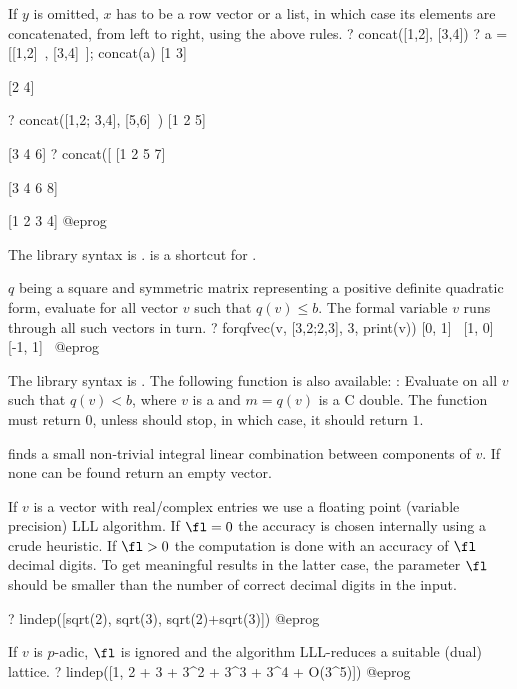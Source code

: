 If $y$ is omitted, $x$ has to be a row vector or a list, in which case its
elements are concatenated, from left to right, using the above rules.
\bprog
? concat([1,2], [3,4])
? a = [[1,2]~, [3,4]~]; concat(a)
[1 3]

[2 4]

? concat([1,2; 3,4], [5,6]~)
[1 2 5]

[3 4 6]
? concat([%
[1 2 5 7]

[3 4 6 8]

[1 2 3 4]
@eprog

The library syntax is .
 is a shortcut for .

\label{se:forqfvec}
$q$ being a square and symmetric matrix representing a positive definite
quadratic form, evaluate  for all vector $v$ such that $q(v)\leq b$.
The formal variable $v$ runs through all such vectors in turn.
\bprog
? forqfvec(v, [3,2;2,3], 3, print(v))
[0, 1]~
[1, 0]~
[-1, 1]~
@eprog

The library syntax is .
The following function is also available:
:
Evaluate  on all $v$ such that $q(v)<b$, where $v$ is a
 and $m=q(v)$ is a C double. The function  must
return $0$, unless  should stop, in which case, it should
return $1$.

\label{se:lindep}
 finds a small non-trivial integral linear
combination between components of $v$. If none can be found return an empty
vector.

If $v$ is a vector with real/complex entries we use a floating point
(variable precision) LLL algorithm. If $\fl = 0$ the accuracy is chosen
internally using a crude heuristic. If $\fl > 0$ the computation is done with
an accuracy of $\fl$ decimal digits. To get meaningful results in the latter
case, the parameter $\fl$ should be smaller than the number of correct
decimal digits in the input.

\bprog
? lindep([sqrt(2), sqrt(3), sqrt(2)+sqrt(3)])
@eprog

If $v$ is $p$-adic, $\fl$ is ignored and the algorithm LLL-reduces a
suitable (dual) lattice.
\bprog
? lindep([1, 2 + 3 + 3^2 + 3^3 + 3^4 + O(3^5)])
@eprog

